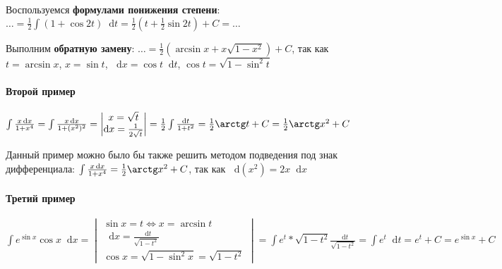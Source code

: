 \documentclass{article}
\newcommand*\diff{\mathop{}\!\mathrm{d}}
\begin{document}
Воспользуемся \textbf{формулами понижения степени}: $\dots = \frac{1}{2} \int (1 + \cos 2 t) \diff t = \frac{1}{2} (t + \frac{1}{2} \sin 2t) + C = \dots$

Выполним \textbf{обратную замену}: $\dots = \frac{1}{2} (\arcsin x + x \sqrt{1 - x^2}) + C$, так как $t = \arcsin x$, $x = \sin t$, $\diff x = \cos t \diff t$, $\cos t = \sqrt{1 - \sin^2 t}$

\paragraph{Второй пример}

$\int \frac{x \diff x}{1 + x^4} = \int \frac{x \diff x}{1 + (x^2)^2} = \begin{vmatrix}
    x = \sqrt{t} \\
    \diff x = \frac{1}{2 \sqrt{t}}
\end{vmatrix} = \frac{1}{2} \int \frac{\diff t}{1 + t^2} = \frac{1}{2} \arctg t + C = \frac{1}{2} \arctg x^2 + C$

Данный пример можно было бы также решить методом подведения под знак дифференциала: $\int \frac{x \diff x}{1 + x^4} = \frac{1}{2} \arctg x^2 + C$, так как $\diff (x^2) = 2 x \diff x$

\paragraph{Третий пример}

$\int e^{\sin x} \cos x \diff x = \begin{vmatrix} 
    \sin x = t \Longleftrightarrow x = \arcsin t \\
    \diff x = \frac{\diff t}{\sqrt{1 - t^2}} \\
    \cos x = \sqrt{1 - \sin^2 x} = \sqrt{1 - t^2}
\end{vmatrix} = \int e^{t} * \sqrt{1 - t^2} \frac{\diff t}{\sqrt{1 - t^2}} = \int e^{t} \diff t = e^{t} + C = e^{\sin x} + C$
\end{document}
